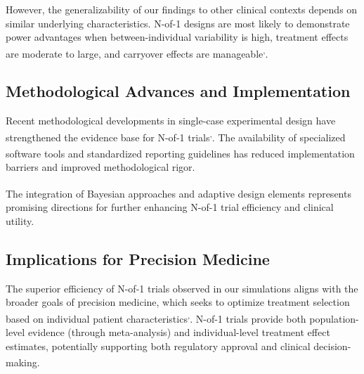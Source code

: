 \documentclass[
  11pt,
]{article}
\begin{document}
However, the generalizability of our findings to other clinical contexts
depends on similar underlying characteristics. N-of-1 designs are most
likely to demonstrate power advantages when between-individual
variability is high, treatment effects are moderate to large, and
carryover effects are
manageable\textsuperscript{,}.

\subsection{Methodological Advances and
Implementation}\label{methodological-advances-and-implementation}

Recent methodological developments in single-case experimental design
have strengthened the evidence base for N-of-1
trials\textsuperscript{,}.
The availability of specialized software
tools\textsuperscript{} and
standardized reporting
guidelines\textsuperscript{}
has reduced implementation barriers and improved methodological rigor.

The integration of Bayesian
approaches\textsuperscript{}
and adaptive design
elements\textsuperscript{}
represents promising directions for further enhancing N-of-1 trial
efficiency and clinical utility.

\subsection{Implications for Precision
Medicine}\label{implications-for-precision-medicine}

The superior efficiency of N-of-1 trials observed in our simulations
aligns with the broader goals of precision medicine, which seeks to
optimize treatment selection based on individual patient
characteristics\textsuperscript{,}.
N-of-1 trials provide both population-level evidence (through
meta-analysis) and individual-level treatment effect estimates,
potentially supporting both regulatory approval and clinical
decision-making\textsuperscript{}.
\end{document}
